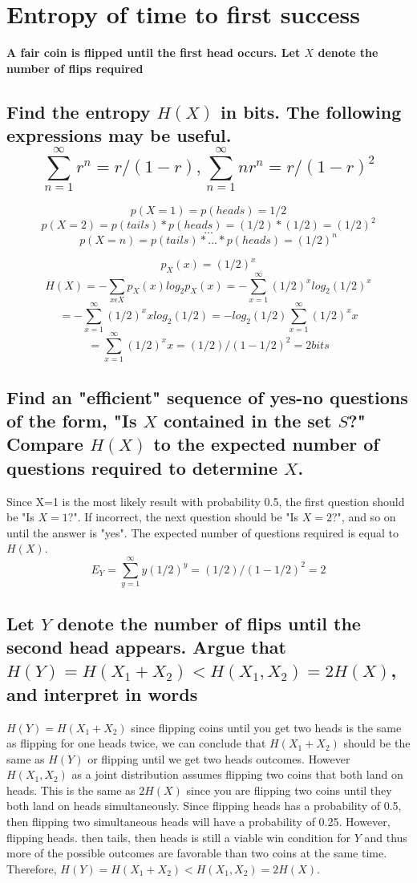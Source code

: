 \documentclass[11pt, oneside]{book}   	%
\begin{document}
\section{Entropy of time to first success}
\textbf{A fair coin is flipped until the first head occurs.  Let $X$ denote the number of flips required}
\subsection{Find the entropy $H(X)$ in bits.  The following expressions may be useful.  $$\sum_{n=1}^{\infty}r^n = r/(1-r), \sum_{n=1}^{\infty}nr^n=r/(1-r)^2$$}

$$p(X=1)=p(heads)=1/2$$
$$p(X=2)=p(tails)*p(heads)=(1/2) * (1/2) = (1/2)^2$$
$$...$$
$$p(X=n)=p(tails)*...*p(heads)=(1/2)^n$$

$$p_X(x)=(1/2)^x$$
$$H(X) = -\sum_{x\epsilon X}p_X(x)log_2p_X(x)= -\sum_{x=1}^{\infty}(1/2)^xlog_2(1/2)^x$$
$$= -\sum_{x=1}^{\infty}(1/2)^xxlog_2(1/2)= -log_2(1/2)\sum_{x=1}^{\infty}(1/2)^xx$$
$$=\sum_{x=1}^{\infty}(1/2)^xx=(1/2)/(1-1/2)^2=2 bits$$
\subsection{Find an "efficient" sequence of yes-no questions of the form, "Is $X$ contained in the set $S$?"  Compare $H(X)$ to the expected number of questions required to determine $X$.}
Since X=1 is the most likely result with probability 0.5, the first question should be "Is $X=1$?".  If incorrect, the next question should be "Is $X=2$?", and so on until the answer is "yes".  The expected number of questions required is equal to $H(X)$.
$$E_Y=\sum_{y=1}^{\infty}y(1/2)^y=(1/2)/(1-1/2)^2 = 2$$
\subsection{Let $Y$ denote the number of flips until the second head appears.  Argue that $H(Y)=H(X_1+X_2) < H(X_1,X_2)=2H(X)$, and interpret in words}
$H(Y)=H(X_1+X_2)$ since flipping coins until you get two heads is the same as flipping for one heads twice, we can conclude that $H(X_1+X_2)$ should be the same as $H(Y)$ or flipping until we get two heads outcomes.  However $H(X_1,X_2)$ as a joint distribution assumes flipping two coins that both land on heads.  This is the same as $2H(X)$ since you are flipping two coins until they both land on heads simultaneously.  Since flipping heads has a probability of 0.5, then flipping two simultaneous heads will have a probability of 0.25.  However, flipping heads. then tails, then heads is still a viable win condition for $Y$ and thus more of the possible outcomes are favorable than two coins at the same time.  Therefore, $H(Y)=H(X_1+X_2) < H(X_1,X_2)=2H(X)$.
\end{document}
